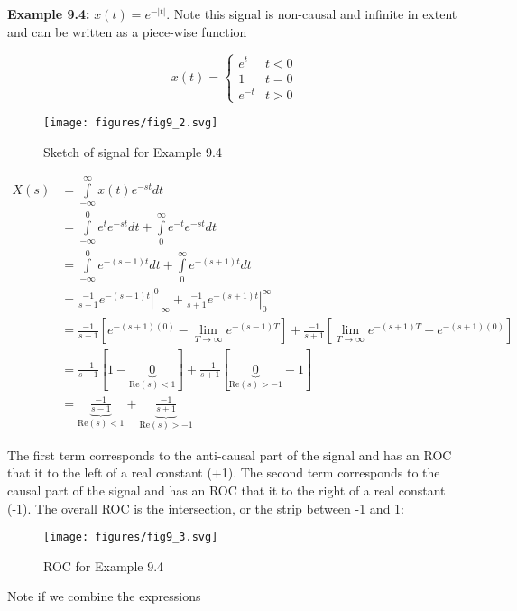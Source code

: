 \documentclass{article}
\begin{document}
\textbf{Example 9.4:} $x(t) = e^{-|t|}$. Note this signal is non-causal and infinite in extent and can be written as a piece-wise function

\[
x(t) = \left\{ \begin{array}{cc}
  e^t & t < 0\\
  1 & t = 0\\
  e^{-t} & t > 0
\end{array}
\right.
\]

\begin{figure}
  \centering
  \texttt{[image: figures/fig9\_2.svg]}
  \caption{Sketch of signal for Example 9.4}
\end{figure}

\begin{align}
  X(s) &= \int\limits_{-\infty}^{\infty} x(t) e^{-st} dt\\
  &= \int\limits_{-\infty}^{0} e^{t} e^{-st} dt + \int\limits_{0}^{\infty} e^{-t} e^{-st} dt\\
  &= \int\limits_{-\infty}^{0} e^{-(s-1)t} dt + \int\limits_{0}^{\infty} e^{-(s+1)t} dt\\
  &= \left. \frac{-1}{s-1} e^{-(s-1)t} \right|_{-\infty}^{0} + \left. \frac{-1}{s+1} e^{-(s+1)t} \right|_{0}^{\infty}\\
  &= \frac{-1}{s-1} \left[e^{-(s+1)(0)} - \lim_{T\rightarrow \infty} e^{-(s-1)T} \right] + \frac{-1}{s+1} \left[\lim_{T\rightarrow \infty} e^{-(s+1)T} - e^{-(s+1)(0)} \right]\\
  &= \frac{-1}{s-1} \left[1 - \underbrace{0}_{\text{Re}(s) < 1} \right] + \frac{-1}{s+1} \left[\underbrace{0}_{\text{Re}(s) > -1} - 1 \right]\\
  &= \underbrace{\frac{-1}{s-1}}_{\text{Re}(s) < 1} +  \underbrace{\frac{-1}{s+1}}_{\text{Re}(s) > -1}
\end{align}

The first term corresponds to the anti-causal part of the signal and has an ROC that it to the left of a real constant (+1). The second term corresponds to the causal part of the signal and has an ROC that it to the right of a real constant (-1). The overall ROC is the intersection, or the strip between -1 and 1:

\begin{figure}
  \centering
  \texttt{[image: figures/fig9\_3.svg]}
  \caption{ROC for Example 9.4}
\end{figure}

Note if we combine the expressions
\end{document}

